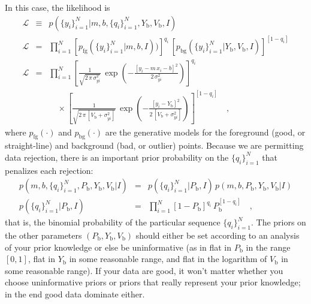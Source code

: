 \documentclass[12pt,twoside]{article}
\newcommand{\setofall}[3]{\{{#1}\}_{{#2}}^{{#3}}}
\newcommand{\allq}{\setofall{q_i}{i=1}{N}}
\newcommand{\ally}{\setofall{y_i}{i=1}{N}}
\newcommand{\like}{\mathscr{L}}
\newcommand{\pfg}{p_{\mathrm{fg}}}
\newcommand{\pbg}{p_{\mathrm{bg}}}
\newcommand{\Pbad}{P_{\mathrm{b}}}
\newcommand{\Ybad}{Y_{\mathrm{b}}}
\newcommand{\Vbad}{V_{\mathrm{b}}}
\begin{document}
In this case, the likelihood is
\begin{eqnarray}\displaystyle
\like &\equiv& p(\ally|m,b,\allq,\Ybad,\Vbad,I)
 \nonumber\\
\like &=& \prod_{i=1}^N
 \left[\pfg(\ally|m,b,I))\right]^{q_i}\,
 \left[\pbg(\ally|\Ybad,\Vbad,I)\right]^{[1-q_i]}
 \nonumber\\
\like &=& \prod_{i=1}^N \left[\frac{1}{\sqrt{2\,\pi\,\sigma_{yi}^2}}
 \,\exp\left(-\frac{[y_i-m\,x_i-b]^2}{2\,\sigma_{yi}^2}\right)\right]^{q_i}
 \nonumber \\ & & \quad\times
 \left[\frac{1}{\sqrt{2\,\pi\,[\Vbad+\sigma_{yi}^2]}}
 \,\exp\left(-\frac{[y_i-\Ybad]^2}{2\,[\Vbad+\sigma_{yi}^2]}\right)\right]^{[1-q_i]}
 \quad ,
\end{eqnarray}
where $\pfg(\cdot)$ and $\pbg(\cdot)$ are the generative models for
the foreground (good, or straight-line) and background (bad, or
outlier) points.  Because we are permitting data rejection, there is
an important prior probability on the $\allq$ that penalizes each
rejection:
\begin{eqnarray}\displaystyle
p(m,b,\allq,\Pbad,\Ybad,\Vbad|I)
 &=& p(\allq|\Pbad,I)\,p(m,b,\Pbad,\Ybad,\Vbad|I)
 \nonumber\\
p(\allq|\Pbad,I)
 &=& \prod_{i=1}^N[1-\Pbad]^{q_i}\,\Pbad^{[1-q_i]}
 \quad ,
\end{eqnarray}
that is, the binomial probability of the particular sequence $\allq$.
The priors on the other parameters $(\Pbad,\Ybad,\Vbad)$ should either
be set according to an analysis of your prior knowledge or else be
uninformative (as in flat in $\Pbad$ in the range $[0,1]$, flat in
$\Ybad$ in some reasonable range, and flat in the logarithm of $\Vbad$
in some reasonable range).  If your data are good, it won't matter
whether you choose uninformative priors or priors that really
represent your prior knowledge; in the end good data dominate either.
\end{document}
